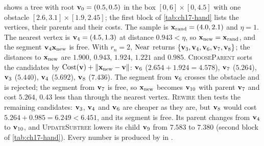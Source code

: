 \begin{example}
\label{ex:ch17-hand}
 shows a tree with root $\mathbf{v}_0=(0.5,0.5)$ in the
box $[0,6]\times[0,4.5]$ with one obstacle $[2.6,3.1]\times[1.9,2.45]$; the
first block of \cref{tab:ch17-hand} lists the vertices, their parents and
their costs. The sample is $\mathbf{x}_{\mathrm{rand}}=(4.0,2.1)$ and $\eta=1$. The
nearest vertex is $\mathbf{v}_4=(4.5,1.3)$ at distance $0.943<\eta$, so
$\mathbf{x}_{\mathrm{new}}=\mathbf{x}_{\mathrm{rand}}$, and the segment $\mathbf{v}_4\mathbf{x}_{\mathrm{new}}$ is
free. With $r_n=2$, $\operatorname{Near}$ returns $\left\{ \mathbf{v}_3,\mathbf{v}_4,\mathbf{v}_6,\mathbf{v}_7,\mathbf{v}_8 \right\}$; the
distances to $\mathbf{x}_{\mathrm{new}}$ are $1.900$, $0.943$, $1.924$, $1.221$ and
$0.985$. \textsc{ChooseParent} sorts the candidates by
$\mathrm{Cost}(\mathbf{v})+\left\lVert \mathbf{x}_{\mathrm{new}}-\mathbf{v} \right\rVert$: $\mathbf{v}_6$ ($2.654+1.924=4.578$),
$\mathbf{v}_7$ ($5.264$), $\mathbf{v}_3$ ($5.440$), $\mathbf{v}_4$ ($5.692$), $\mathbf{v}_8$ ($7.436$). The
segment from $\mathbf{v}_6$ crosses the obstacle and is rejected; the segment from
$\mathbf{v}_7$ is free, so $\mathbf{x}_{\mathrm{new}}$ becomes $\mathbf{v}_{10}$ with parent $\mathbf{v}_7$ and
cost $5.264$, $0.43$ less than through the nearest vertex. \textsc{Rewire}
then tests the remaining candidates: $\mathbf{v}_3$, $\mathbf{v}_4$ and $\mathbf{v}_6$ are cheaper as
they are, but $\mathbf{v}_8$ would cost $5.264+0.985=6.249<6.451$, and its segment is
free. Its parent changes from $\mathbf{v}_4$ to $\mathbf{v}_{10}$, and \textsc{UpdateSubtree}
lowers its child $\mathbf{v}_9$ from $7.583$ to $7.380$ (second block of
\cref{tab:ch17-hand}). Every number is produced by  in
.
\end{example}

